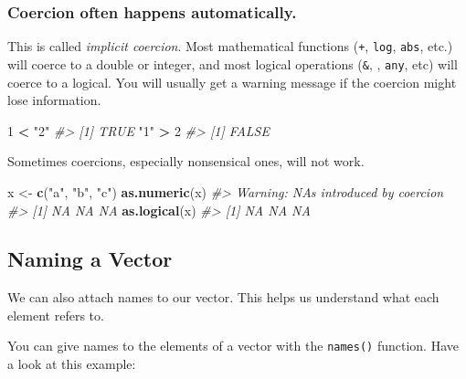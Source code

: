 \documentclass[
]{book}
\newenvironment{Shaded}{\begin{snugshade}}{\end{snugshade}}
\newcommand{\CommentTok}[1]{\textcolor[rgb]{0.56,0.35,0.01}{\textit{#1}}}
\newcommand{\DecValTok}[1]{\textcolor[rgb]{0.00,0.00,0.81}{#1}}
\newcommand{\KeywordTok}[1]{\textcolor[rgb]{0.13,0.29,0.53}{\textbf{#1}}}
\newcommand{\NormalTok}[1]{#1}
\newcommand{\OperatorTok}[1]{\textcolor[rgb]{0.81,0.36,0.00}{\textbf{#1}}}
\newcommand{\StringTok}[1]{\textcolor[rgb]{0.31,0.60,0.02}{#1}}
\begin{document}
\hypertarget{coercion-often-happens-automatically.}{%
\subsubsection*{Coercion often happens automatically.}\label{coercion-often-happens-automatically.}}

This is called \emph{implicit coercion}. Most mathematical functions (\texttt{+}, \texttt{log}, \texttt{abs}, etc.) will coerce to a double or integer, and most logical operations (\texttt{\&}, \texttt{\textbar{}}, \texttt{any}, etc) will coerce to a logical. You will usually get a warning message if the coercion might lose information.

\begin{Shaded}
\begin{Highlighting}[]
\DecValTok{1} \OperatorTok{<}\StringTok{ "2"}
\CommentTok{#> [1] TRUE}
\StringTok{"1"} \OperatorTok{>}\StringTok{ }\DecValTok{2}
\CommentTok{#> [1] FALSE}
\end{Highlighting}
\end{Shaded}

Sometimes coercions, especially nonsensical ones, will not work.

\begin{Shaded}
\begin{Highlighting}[]
\NormalTok{x <-}\StringTok{ }\KeywordTok{c}\NormalTok{(}\StringTok{"a"}\NormalTok{, }\StringTok{"b"}\NormalTok{, }\StringTok{"c"}\NormalTok{)}
\KeywordTok{as.numeric}\NormalTok{(x)}
\CommentTok{#> Warning: NAs introduced by coercion}
\CommentTok{#> [1] NA NA NA}
\KeywordTok{as.logical}\NormalTok{(x)}
\CommentTok{#> [1] NA NA NA}
\end{Highlighting}
\end{Shaded}

\hypertarget{naming-a-vector}{%
\subsection{Naming a Vector}\label{naming-a-vector}}

We can also attach names to our vector. This helps us understand what each element refers to.

You can give names to the elements of a vector with the \texttt{names()} function. Have a look at this example:
\end{document}
